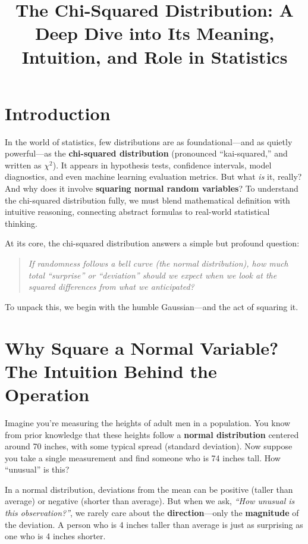 \documentclass[12pt]{article}
\title{\textbf{The Chi-Squared Distribution: A Deep Dive into Its Meaning, Intuition, and Role in Statistics}}
\author{}
\date{}
\begin{document}
\maketitle
\Large

\section*{Introduction}

In the world of statistics, few distributions are as foundational—and as quietly powerful—as the \textbf{chi-squared distribution} (pronounced ``kai-squared,'' and written as $\chi^2$). It appears in hypothesis tests, confidence intervals, model diagnostics, and even machine learning evaluation metrics. But what \emph{is} it, really? And why does it involve \textbf{squaring normal random variables}? To understand the chi-squared distribution fully, we must blend mathematical definition with intuitive reasoning, connecting abstract formulas to real-world statistical thinking.

At its core, the chi-squared distribution answers a simple but profound question:
\begin{quote}
    \emph{If randomness follows a bell curve (the normal distribution), how much total ``surprise'' or ``deviation'' should we expect when we look at the squared differences from what we anticipated?}
\end{quote}
To unpack this, we begin with the humble Gaussian—and the act of squaring it.

\section*{Why Square a Normal Variable? The Intuition Behind the Operation}

Imagine you’re measuring the heights of adult men in a population. You know from prior knowledge that these heights follow a \textbf{normal distribution} centered around 70 inches, with some typical spread (standard deviation). Now suppose you take a single measurement and find someone who is 74 inches tall. How ``unusual'' is this?

In a normal distribution, deviations from the mean can be positive (taller than average) or negative (shorter than average). But when we ask, \emph{``How unusual is this observation?''}, we rarely care about the \textbf{direction}—only the \textbf{magnitude} of the deviation. A person who is 4 inches taller than average is just as surprising as one who is 4 inches shorter.
\end{document}
